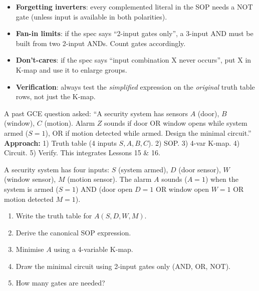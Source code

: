 \documentclass[11pt]{article}
\begin{document}
\begin{attention}
\begin{itemize}
\item \textbf{Forgetting inverters}: every complemented literal in the SOP needs a NOT gate (unless input is available in both polarities).
\item \textbf{Fan-in limits}: if the spec says ``2-input gates only'', a 3-input AND must be built from two 2-input ANDs. Count gates accordingly.
\item \textbf{Don't-cares}: if the spec says ``input combination X never occurs'', put X in K-map and use it to enlarge groups.
\item \textbf{Verification}: always test the \emph{simplified} expression on the \emph{original} truth table rows, not just the K-map.
\end{itemize}
\end{attention}

\begin{savaistu}
A past GCE question asked: ``A security system has sensors $A$ (door), $B$ (window), $C$ (motion). Alarm $Z$ sounds if door OR window opens while system armed ($S=1$), OR if motion detected while armed. Design the minimal circuit.''
\textbf{Approach:} 1) Truth table (4 inputs $S,A,B,C$). 2) SOP. 3) 4-var K-map. 4) Circuit. 5) Verify. This integrates Lessons 15 \& 16.
\end{savaistu}

\begin{exercice}
A security system has four inputs: $S$ (system armed), $D$ (door sensor), $W$ (window sensor), $M$ (motion sensor). The alarm $A$ sounds ($A=1$) when the system is armed ($S=1$) AND (door open $D=1$ OR window open $W=1$ OR motion detected $M=1$).
\begin{enumerate}
\item Write the truth table for $A(S,D,W,M)$.
\item Derive the canonical SOP expression.
\item Minimise $A$ using a 4-variable K-map.
\item Draw the minimal circuit using 2-input gates only (AND, OR, NOT).
\item How many gates are needed?
\end{enumerate}
\end{exercice}
\end{document}
